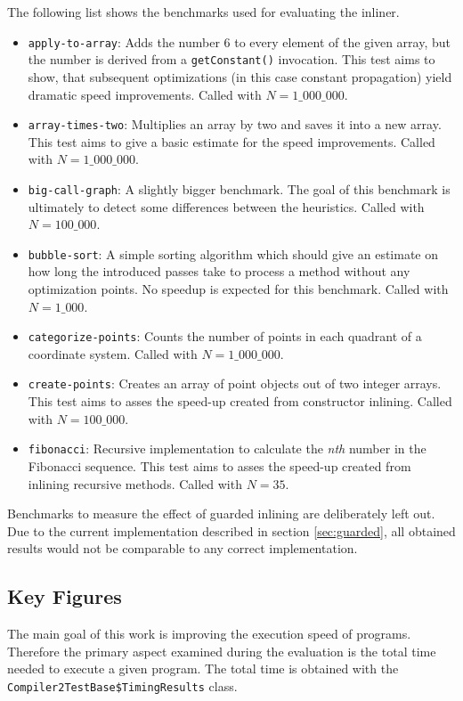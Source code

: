 \documentclass[draft, final]{vutinfth} %
\begin{document}
The following list shows the benchmarks used for evaluating the inliner.

\begin{itemize}
    \item \texttt{apply-to-array}: Adds the number $6$ to every element of the given array, but the number is derived from a \texttt{getConstant()} invocation. This test aims to show, that subsequent optimizations (in this case constant propagation) yield dramatic speed improvements. Called with $N = 1\_000\_000$.
    \item \texttt{array-times-two}: Multiplies an array by two and saves it into a new array. This test aims to give a basic estimate for the speed improvements. Called with $N = 1\_000\_000$.
    \item \texttt{big-call-graph}: A slightly bigger benchmark. The goal of this benchmark is ultimately to detect some differences between the heuristics. Called with $N = 100\_000$.
    \item \texttt{bubble-sort}: A simple sorting algorithm which should give an estimate on how long the introduced passes take to process a method without any optimization points. No speedup is expected for this benchmark. Called with $N = 1\_000$.
    \item \texttt{categorize-points}: Counts the number of points in each quadrant of a coordinate system. Called with $N = 1\_000\_000$.
    \item \texttt{create-points}: Creates an array of point objects out of two integer arrays. This test aims to asses the speed-up created from constructor inlining. Called with $N = 100\_000$.
    \item \texttt{fibonacci}: Recursive implementation to calculate the \emph{nth} number in the Fibonacci sequence. This test aims to asses the speed-up created from inlining recursive methods. Called with $N = 35$.
\end{itemize}

Benchmarks to measure the effect of guarded inlining are deliberately left out. Due to the current implementation described in section \ref{sec:guarded}, all obtained results would not be comparable to any correct implementation.

\subsection{Key Figures}

The main goal of this work is improving the execution speed of programs. Therefore the primary aspect examined during the evaluation is the total time needed to execute a given program. The total time is obtained with the \texttt{Compiler2TestBase\$TimingResults} class.
\end{document}

